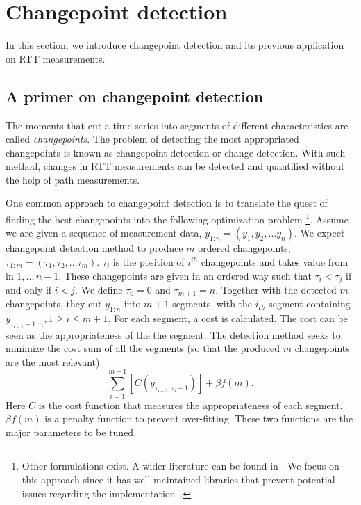 \section{Changepoint detection}
\label{sec:cpt}
In this section, we introduce changepoint detection and its previous application on RTT measurements.

\subsection{A primer on changepoint detection}
The moments that cut a time series into segments of different characteristics are called \textit{changepoints}.
The problem of detecting the most appropriated changepoints is known as changepoint detection or change detection.
With such method, changes in RTT measurements can be detected and quantified without the help of path measurements.

One common approach to changepoint detection is to translate the quest of finding the best changepoints into the following optimization problem \footnote{Other formulations exist. A wider literature can be found in \cite{Haynes2016, Eckley2011}. We focus on this approach since it has well maintained libraries that prevent potential issues regarding the implementation~\cite{Killick2013a, Haynes2016}.}.
Assume we are given a sequence of measurement data, $y_{1:n} = (y_1, y_2,...y_n)$.
We expect changepoint detection method to produce $m$ ordered changepoints, $\tau_{1:m} = (\tau_1, \tau_2,...\tau_m)$.
$\tau_i$ is the position of $i^{th}$ changepoints and takes value from in ${1,..,n-1}$.
These changepoints are given in an ordered way such that $\tau_i < \tau_j$ if and only if $i < j$.
We define $\tau_0 = 0$ and $\tau_{m+1} = n$.
Together with the detected $m$ changepoints, they cut $y_{1:n}$ into $m+1$ segments, with the $i_{th}$ segment containing $y_{\tau_{i-1}+1:\tau_i}, 1 \geq i \leq m+1 $.
For each segment, a cost is calculated. 
The cost can be seen as the appropriateness of the the segment.
The detection method seeks to minimize the cost sum of all the segments (so that the produced $m$ changepoints are the most relevant): 
\begin{equation*}
\sum_{i=1}^{m+1}[C(y_{\tau_{i-1}:\tau_i-1})] + \beta f(m).
\end{equation*}
Here $C$ is the cost function that measures the appropriateness of each segment.
$\beta f(m)$ is a penalty function to prevent over-fitting.
These two functions are the major parameters to be tuned.

